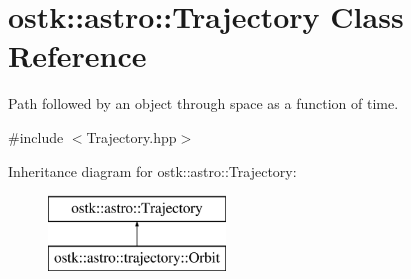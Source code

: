 \hypertarget{classostk_1_1astro_1_1_trajectory}{}\section{ostk\+:\+:astro\+:\+:Trajectory Class Reference}
\label{classostk_1_1astro_1_1_trajectory}


Path followed by an object through space as a function of time.  




{\ttfamily \#include $<$Trajectory.\+hpp$>$}

Inheritance diagram for ostk\+:\+:astro\+:\+:Trajectory\+:\begin{figure}[H]
\begin{center}
\leavevmode
\includegraphics[height=2.000000cm]{classostk_1_1astro_1_1_trajectory}
\end{center}
\end{figure}
